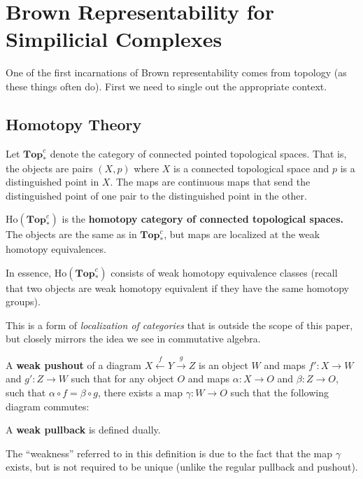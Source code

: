 \documentclass[12pt]{article}
\newcommand*{\pTopc}{\mathbf{Top}_\ast^c}
\begin{document}
\section{Brown Representability for Simpilicial Complexes}
One of the first incarnations of Brown representability comes from topology (as these things often do). First we need to single out 
the appropriate context.

\subsection{Homotopy Theory}
\begin{defn}
	Let $\pTopc$ denote the category of connected pointed topological spaces. That is, the objects are pairs $(X,p)$ where $X$ is a connected 
	topological space and $p$ is a distinguished point in $X$. The maps are continuous maps that send the distinguished point of one pair to the distinguished point in the other.
\end{defn}
\begin{defn}
	$\text{Ho}(\pTopc)$ is the \textbf{homotopy category of connected topological spaces.} The objects are the same as in $\pTopc$, 
	but maps are localized at the weak homotopy equivalences.
\end{defn}
\begin{rmk}
	In essence, $\text{Ho}(\pTopc)$ consists of weak homotopy equivalence classes (recall that two objects are weak homotopy equivalent if they have the same 
	homotopy groups).
\end{rmk}
\begin{rmk}
	This is a form of \textit{localization of categories} that is outside the scope of this paper, but closely mirrors the idea 
	we see in commutative algebra.
\end{rmk}
\begin{defn}
	A \textbf{weak pushout} of a diagram $X\xleftarrow{f}Y\xrightarrow{g}Z$ is an object $W$ and maps 
	$f':X\to W$ and $g':Z\to W$ such that for any object $O$ and maps $\alpha:X\to O$ and $\beta:Z\to O$, 
	such that $\alpha\circ f=\beta\circ g$, there exists a map $\gamma:W\to O$ such that the following diagram commutes:
	\begin{center}
	\end{center}

	A \textbf{weak pullback} is defined dually.
\end{defn}
\begin{rmk}
	The ``weakness'' referred to in this definition is due to the fact that the map $\gamma$ exists, but is not 
	required to be unique (unlike the regular pullback and pushout).
\end{rmk}
\end{document}
